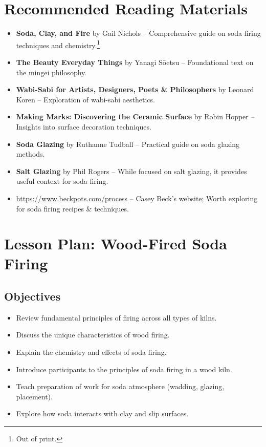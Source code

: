 \documentclass[12pt]{scrartcl}
\begin{document}


\section*{Recommended Reading Materials}

\begin{itemize}
  \item \textbf{Soda, Clay, and Fire} by Gail Nichols -- Comprehensive guide on soda firing techniques and chemistry.\footnote{Out of print.}
  \item \textbf{The Beauty Everyday Things} by Yanagi Sōetsu -- Foundational text on the mingei philosophy.
  \item \textbf{Wabi-Sabi for Artists, Designers, Poets \& Philosophers} by Leonard Koren -- Exploration of wabi-sabi aesthetics.
  \item \textbf{Making Marks: Discovering the Ceramic Surface} by Robin Hopper -- Insights into surface decoration techniques.
  \item \textbf{Soda Glazing} by Ruthanne Tudball -- Practical guide on soda glazing methods.
  \item \textbf{Salt Glazing} by Phil Rogers -- While focused on salt glazing, it provides useful context for soda firing.
  \item \url{https://www.beckpots.com/process} -- Casey Beck's website; Worth exploring for soda firing recipes \& techniques.
\end{itemize}


\clearpage



\thispagestyle{noPrint}

\section*{Lesson Plan: Wood-Fired Soda Firing}

\subsection*{Objectives}
\begin{itemize}
    \item Review fundamental principles of firing across all types of kilns.
    \item Discuss the unique characteristics of wood firing.
    \item Explain the chemistry and effects of soda firing.
    \item Introduce participants to the principles of soda firing in a wood kiln.
    \item Teach preparation of work for soda atmosphere (wadding, glazing, placement).
    \item Explore how soda interacts with clay and slip surfaces.
\end{itemize}
\end{document}

